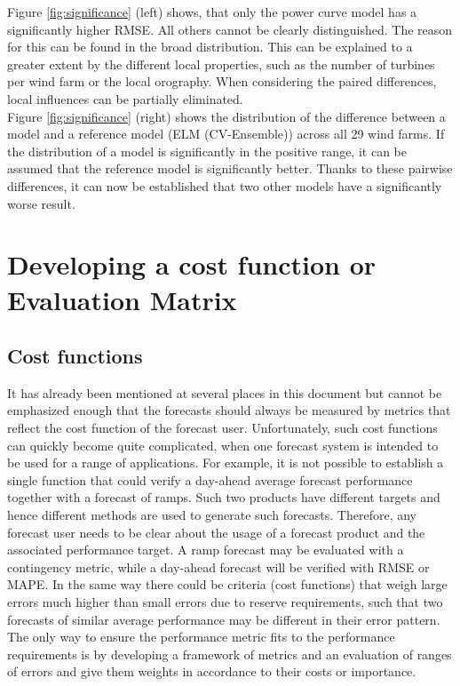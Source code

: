 Figure \ref{fig:significance} (left) shows, that only the power curve model has a significantly higher RMSE. All others cannot be clearly distinguished. The reason for this can be found in the broad distribution. This can be explained to a greater extent by the different local properties, such as the number of turbines per wind farm or the local orography. When considering the paired differences, local influences can be partially eliminated. \\

Figure \ref{fig:significance} (right) shows the distribution of the difference between a model and a reference model (ELM (CV-Ensemble)) across all 29 wind farms. If the distribution of a model is significantly in the positive range, it can be assumed that the reference model is significantly better. Thanks to these pairwise differences, it can now be established that two other models have a significantly worse result.  



\section{Developing a cost function or Evaluation Matrix  }\label{sec:costfunc}

\subsection{Cost functions }
It has already been mentioned at several places in this document but cannot be emphasized enough that the forecasts should always be measured by metrics that reflect the cost function of the forecast user.
Unfortunately, such cost functions can quickly become quite complicated, when one forecast system is intended to be used for a range of applications. 
For example, it is not possible to establish a single function that could verify a day-ahead average forecast performance together with a forecast of ramps. Such two products have different targets and hence different methods are used to generate such forecasts. Therefore, any forecast user needs to be clear about the usage of a forecast product and the associated performance target. A ramp forecast may be evaluated with a contingency metric, while a day-ahead forecast will be verified with RMSE or MAPE. In the same way there could be criteria (cost functions) that weigh large errors much higher than small errors due to reserve requirements, such that two forecasts of similar average performance may be different in their error pattern.  
The only way to ensure the performance metric fits to the performance requirements is by developing a framework of metrics and an evaluation of ranges of errors and give them weights in accordance to their costs or importance.  

